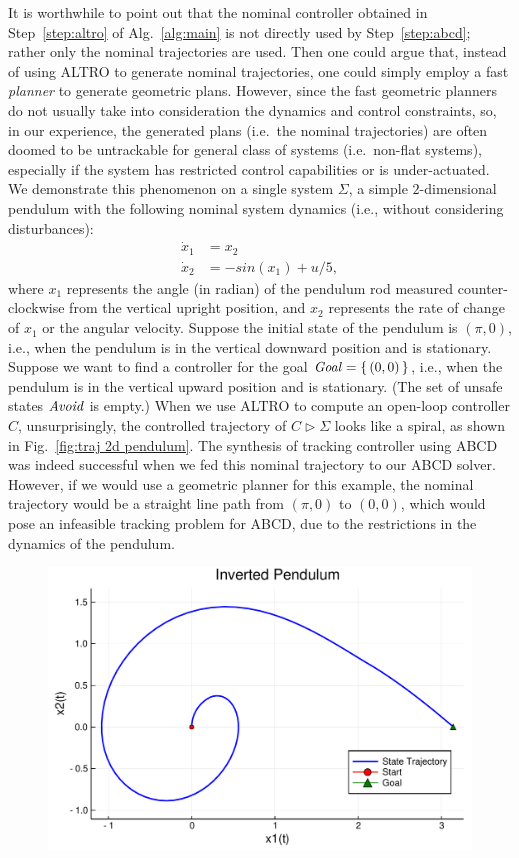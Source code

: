 \begin{remark}
		It is worthwhile to point out that the nominal controller obtained in Step~\ref{step:altro} of Alg.~\ref{alg:main} is not directly used by Step~\ref{step:abcd}; rather only the nominal trajectories are used.
		Then one could argue that, instead of using ALTRO to generate nominal trajectories, one could simply employ a fast \emph{planner} \cite{rrt etc.} to generate geometric plans.
		However, since the fast geometric planners do not usually take into consideration the dynamics and control constraints, so, in our experience, the generated plans (i.e.\ the nominal trajectories) are often doomed to be untrackable for general class of systems (i.e.\ non-flat systems), especially if the system has restricted control capabilities or is under-actuated.
		We demonstrate this phenomenon on a single system $\Sigma$, a simple $2$-dimensional pendulum with the following nominal system dynamics (i.e., without considering disturbances):
		\begin{align*}
			\dot{x}_1 &= x_2\\
   			\dot{x}_2 &= -sin(x_1) + u/5,
		\end{align*}
		where $x_1$ represents the angle (in radian) of the pendulum rod measured counter-clockwise from the vertical upright position, and $x_2$ represents the rate of change of $x_1$ or the angular velocity.
		Suppose the initial state of the pendulum is $(\pi,0)$, i.e., when the pendulum is in the vertical downward position and is stationary.
		Suppose we want to find a controller for the goal $\mathit{Goal} = \set{(0,0)}$, i.e., when the pendulum is in the vertical upward position and is stationary.
		(The set of unsafe states $\mathit{Avoid}$ is empty.)
		When we use ALTRO to compute an open-loop controller $C$, unsurprisingly, the controlled trajectory of $C\triangleright \Sigma$ looks like a spiral, as shown in Fig.~\ref{fig:traj 2d pendulum}.
		The synthesis of tracking controller using ABCD was indeed successful when we fed this nominal trajectory to our ABCD solver.
		However, if we would use a geometric planner for this example, the nominal trajectory would be a straight line path from $(\pi,0)$ to $(0,0)$, which would pose an infeasible tracking problem for ABCD, due to the restrictions in the dynamics of the pendulum.
		\begin{figure}
			\includegraphics[scale=0.2]{figures/2d_pendulum_spiral}

\end{figure}
\end{remark}

